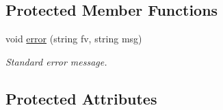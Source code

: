 \subsection*{Protected Member Functions}
\begin{DoxyCompactItemize}
\item 
\hypertarget{class_agelem_acf0a31790483a62b9b1f46a2bd73b59a}{}\label{class_agelem_acf0a31790483a62b9b1f46a2bd73b59a} 
void \hyperlink{class_agelem_acf0a31790483a62b9b1f46a2bd73b59a}{error} (string fv, string msg)
\begin{DoxyCompactList}\small\item\em Standard error message. \end{DoxyCompactList}\end{DoxyCompactItemize}
\subsection*{Protected Attributes}
